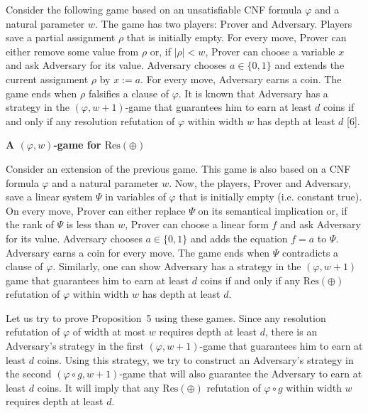 Consider the following game based on an unsatisfiable CNF formula $\varphi$ and a natural parameter $w$. The game has two players: Prover and Adversary. Players save a partial assignment $\rho$ that is initially empty. For every move, Prover can either remove some value from $\rho$ or, if $|\rho|<w$, Prover can choose a variable $x$ and ask Adversary for its value. Adversary chooses $a\in\{0,1\}$ and extends the current assignment $\rho$ by $x:=a$. For every move, Adversary earns a coin. The game ends when $\rho$ falsifies a clause of $\varphi$. It is known that Adversary has a strategy in the $(\varphi,w+1)$-game that guarantees him to earn at least $d$ coins if and only if any resolution refutation of $\varphi$ within width $w$ has depth at least $d$ [6].\par


\par\medskip\noindent\textbf{A $(\varphi,w)$-game for $\mathrm{Res}(\oplus)$
}\par


Consider an extension of the previous game. This game is also based on a CNF formula $\varphi$ and a natural parameter $w$. Now, the players, Prover and Adversary, save a linear system $\Psi$ in variables of $\varphi$ that is initially empty (i.e. constant true). On every move, Prover can either replace $\Psi$ on its semantical implication or, if the rank of $\Psi$ is less than $w$, Prover can choose a linear form $f$ and ask Adversary for its value. Adversary chooses $a\in\{0,1\}$ and adds the equation $f=a$ to $\Psi$. Adversary earns a coin for every move. The game ends when $\Psi$ contradicts a clause of $\varphi$. Similarly, one can show Adversary has a strategy in the $(\varphi,w+1)$ game that guarantees him to earn at least $d$ coins if and only if any $\mathrm{Res}(\oplus)$ refutation of $\varphi$ within width $w$ has depth at least $d$.\par



Let us try to prove Proposition 5 using these games. Since any resolution refutation of $\varphi$ of width at most $w$ requires depth at least $d$, there is an Adversary’s strategy in the first $(\varphi,w+1)$-game that guarantees him to earn at least $d$ coins. Using this strategy, we try to construct an Adversary’s strategy in the second $(\varphi\circ g,w+1)$-game that will also guarantee the Adversary to earn at least $d$ coins. It will imply that any $\mathrm{Res}(\oplus)$ refutation of $\varphi\circ g$ within width $w$ requires depth at least $d$.\par




